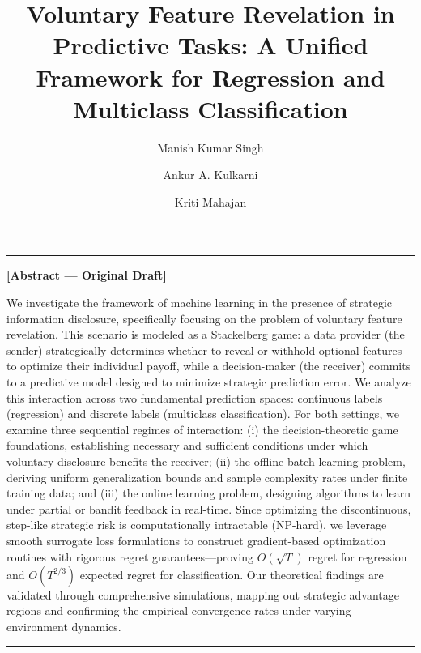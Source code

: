 \documentclass[acmsmall]{acmart}
\newenvironment{sourceblock}[1]{%
  \par\medskip\noindent\textcolor{gray!80}{\rule{\linewidth}{0.5pt}}\par
  \noindent\textbf{\small [#1 --- Original Draft]}\par\small\itshape
}{%
  \par\noindent\textcolor{gray!80}{\rule{\linewidth}{0.5pt}}\par\medskip
}
\begin{document}
\title[Voluntary Feature Revelation]{Voluntary Feature Revelation in Predictive Tasks: A Unified Framework for Regression and Multiclass Classification}

\author{Manish Kumar Singh}

\author{Ankur A. Kulkarni}

\author{Kriti Mahajan}

\begin{sourceblock}{Abstract}
We investigate the framework of machine learning in the presence of strategic information disclosure, specifically focusing on the problem of voluntary feature revelation. This scenario is modeled as a Stackelberg game: a data provider (the sender) strategically determines whether to reveal or withhold optional features to optimize their individual payoff, while a decision-maker (the receiver) commits to a predictive model designed to minimize strategic prediction error. We analyze this interaction across two fundamental prediction spaces: continuous labels (regression) and discrete labels (multiclass classification). For both settings, we examine three sequential regimes of interaction: (i) the decision-theoretic game foundations, establishing necessary and sufficient conditions under which voluntary disclosure benefits the receiver; (ii) the offline batch learning problem, deriving uniform generalization bounds and sample complexity rates under finite training data; and (iii) the online learning problem, designing algorithms to learn under partial or bandit feedback in real-time. Since optimizing the discontinuous, step-like strategic risk is computationally intractable (NP-hard), we leverage smooth surrogate loss formulations to construct gradient-based optimization routines with rigorous regret guarantees—proving $O(\sqrt{T})$ regret for regression and $O(T^{2/3})$ expected regret for classification. Our theoretical findings are validated through comprehensive simulations, mapping out strategic advantage regions and confirming the empirical convergence rates under varying environment dynamics.
\end{sourceblock}
\end{document}
